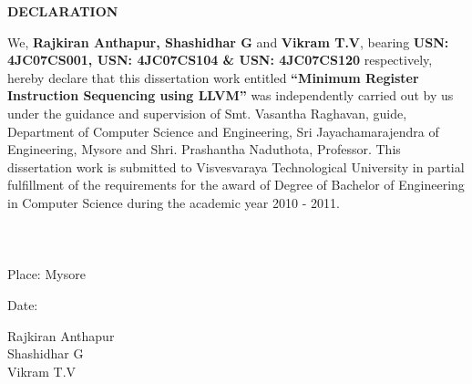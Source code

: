 \documentclass[12pt]{report}
\begin{document}
\begin{center}
{\bf \huge DECLARATION}
\end{center}

\pagestyle{empty}
\vspace{3cm}
We, {\bf Rajkiran Anthapur, Shashidhar G } and {\bf Vikram T.V}, bearing {\bf USN: 4JC07CS001, USN: 4JC07CS104 \& USN: 4JC07CS120} respectively, hereby declare that this dissertation work entitled {\bf ``Minimum Register Instruction Sequencing using LLVM''} was independently carried out by us under the guidance and supervision of Smt. Vasantha Raghavan, guide, Department of Computer Science and Engineering, Sri Jayachamarajendra of Engineering, Mysore and Shri. Prashantha Naduthota, Professor. This dissertation work is submitted to Visvesvaraya Technological University in partial fulﬁllment of the requirements for the award of Degree of Bachelor of Engineering in Computer Science during the academic year 2010 - 2011.\\\\\\\\

Place: Mysore

Date:

\vspace{2cm}

\hspace{4in} Rajkiran Anthapur\\

\hspace{4in} Shashidhar G\\

\hspace{4in} Vikram T.V\\




\end{document}
